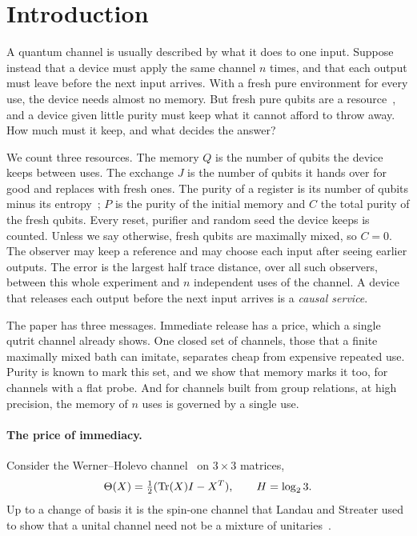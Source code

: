 \section{Introduction}\label{sec:intro}

A quantum channel is usually described by what it does to one input.
Suppose instead that a device must apply the same channel $n$ times, and
that each output must leave before the next input arrives. With a fresh
pure environment for every use, the device needs almost no memory. But
fresh pure qubits are a resource~\cite{RybarZiman2008}, and a device
given little purity must keep what it cannot afford to throw away. How
much must it keep, and what decides the answer?

We count three resources. The memory $Q$ is the number of qubits the
device keeps between uses. The exchange $J$ is the number of qubits it
hands over for good and replaces with fresh ones. The purity of a
register is its number of qubits minus its
entropy~\cite{HorodeckiHorodeckiOppenheim2003}; $P$ is the purity of
the initial memory and $C$ the total purity of the fresh qubits. Every
reset, purifier and random seed the device keeps is counted. Unless we
say otherwise, fresh qubits are maximally mixed, so $C=0$. The observer
may keep a reference and may choose each input after seeing earlier
outputs. The error is the largest half trace distance, over all such
observers, between this whole experiment and $n$ independent uses of the
channel. A device that releases each output before the next input
arrives is a \emph{causal service}.

The paper has three messages. Immediate release has a price, which a
single qutrit channel already shows. One closed set of channels, those
that a finite maximally mixed bath can imitate, separates cheap from
expensive repeated use. Purity is known to mark this set, and we show
that memory marks it too, for channels with a flat probe. And for
channels built from group relations, at high precision, the memory of
$n$ uses is governed by a single use.

\paragraph{The price of immediacy.}
Consider the Werner--Holevo channel~\cite{WernerHolevo2002} on
$3\times3$ matrices,
\[
 \Theta(X)=\tfrac12(\operatorname{Tr}(X)I-X^T),\qquad H=\log_2 3.
\]
Up to a change of basis it is the spin-one channel that Landau and
Streater used to show that a unital channel need not be a mixture of
unitaries~\cite{LandauStreater1993}.

